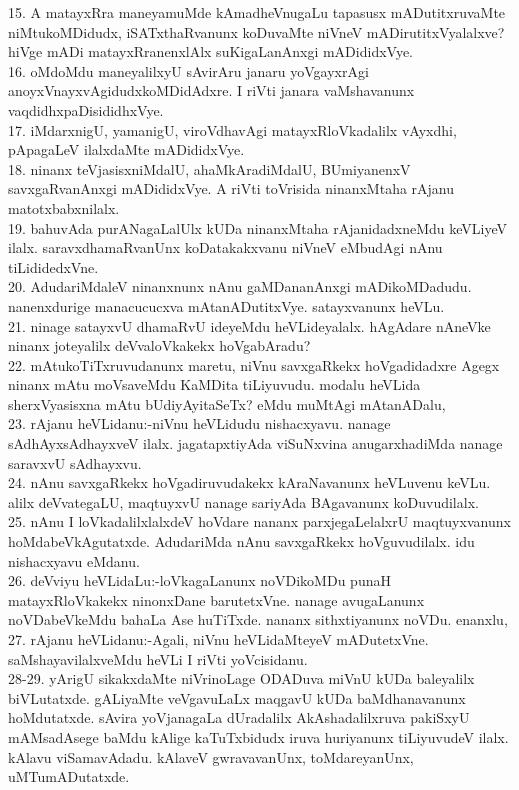 \documentclass{article}
\begin{document}
15. A matayxRra maneyamuMde kAmadheVnugaLu tapasusx mADutitxruvaMte niMtukoMDidudx, iSATxthaRvanunx koDuvaMte niVneV mADirutitxVyalalxve? hiVge mADi matayxRranenxlAlx suKigaLanAnxgi mADididxVye.\\
16. oMdoMdu maneyalilxyU sAvirAru janaru yoVgayxrAgi anoyxVnayxvAgidudxkoMDidAdxre. I riVti janara vaMshavanunx vaqdidhxpaDisididhxVye.\\
17. iMdarxnigU, yamanigU, viroVdhavAgi matayxRloVkadalilx vAyxdhi, pApagaLeV ilalxdaMte mADididxVye.\\
18. ninanx teVjasisxniMdalU, ahaMkAradiMdalU, BUmiyanenxV savxgaRvanAnxgi mADididxVye. A riVti toVrisida ninanxMtaha rAjanu matotxbabxnilalx.\\
19. bahuvAda purANagaLalUlx kUDa ninanxMtaha rAjanidadxneMdu keVLiyeV ilalx. saravxdhamaRvanUnx koDatakakxvanu niVneV eMbudAgi nAnu tiLididedxVne.\\
20. AdudariMdaleV ninanxnunx nAnu gaMDananAnxgi mADikoMDadudu. nanenxdurige manacucucxva mAtanADutitxVye. satayxvanunx heVLu.\\
21. ninage satayxvU dhamaRvU ideyeMdu heVLideyalalx. hAgAdare nAneVke ninanx joteyalilx deVvaloVkakekx hoVgabAradu?\\
22. mAtukoTiTxruvudanunx maretu, niVnu savxgaRkekx hoVgadidadxre Agegx ninanx mAtu moVsaveMdu KaMDita tiLiyuvudu. modalu heVLida sherxVyasisxna mAtu bUdiyAyitaSeTx? eMdu muMtAgi mAtanADalu,\\
23. rAjanu heVLidanu:-niVnu heVLidudu nishacxyavu. nanage sAdhAyxsAdhayxveV ilalx. jagatapxtiyAda viSuNxvina anugarxhadiMda nanage saravxvU sAdhayxvu.\\
24. nAnu savxgaRkekx hoVgadiruvudakekx kAraNavanunx heVLuvenu keVLu. alilx deVvategaLU, maqtuyxvU nanage sariyAda BAgavanunx koDuvudilalx.\\
25. nAnu I loVkadalilxlalxdeV hoVdare nananx parxjegaLelalxrU maqtuyxvanunx hoMdabeVkAgutatxde. AdudariMda nAnu savxgaRkekx hoVguvudilalx. idu nishacxyavu eMdanu.\\
26. deVviyu heVLidaLu:-loVkagaLanunx noVDikoMDu punaH matayxRloVkakekx ninonxDane barutetxVne. nanage avugaLanunx noVDabeVkeMdu bahaLa Ase huTiTxde. nananx sithxtiyanunx noVDu. enanxlu,\\
27. rAjanu heVLidanu:-Agali, niVnu heVLidaMteyeV mADutetxVne. saMshayavilalxveMdu heVLi I riVti yoVcisidanu.\\
28-29. yArigU sikakxdaMte niVrinoLage ODADuva miVnU kUDa baleyalilx biVLutatxde. gALiyaMte veVgavuLaLx maqgavU kUDa baMdhanavanunx hoMdutatxde. sAvira yoVjanagaLa dUradalilx AkAshadalilxruva pakiSxyU mAMsadAsege baMdu kAlige kaTuTxbidudx iruva huriyanunx tiLiyuvudeV ilalx. kAlavu viSamavAdadu. kAlaveV gwravavanUnx, toMdareyanUnx, uMTumADutatxde.\\
\end{document}
